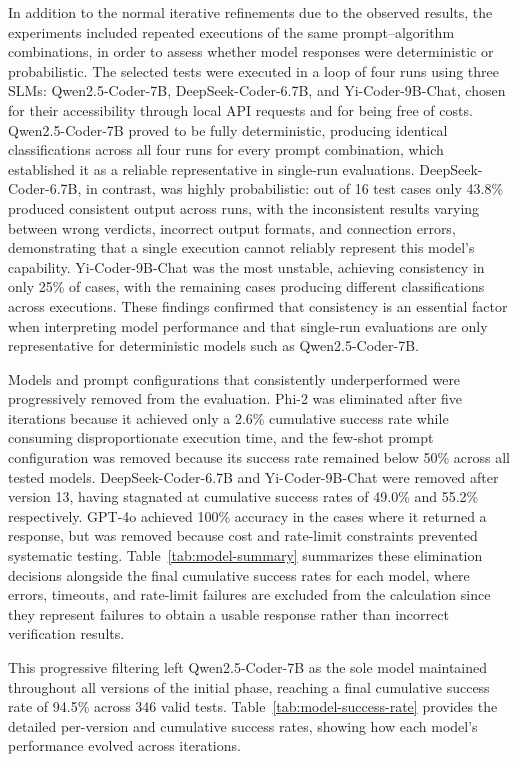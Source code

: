 In addition to the normal iterative refinements due to the observed results, the experiments included repeated executions of the same prompt--algorithm combinations, in order to assess whether model responses were deterministic or probabilistic. The selected tests were executed in a loop of four runs using three SLMs: Qwen2.5-Coder-7B, DeepSeek-Coder-6.7B, and Yi-Coder-9B-Chat, chosen for their accessibility through local API requests and for being free of costs. Qwen2.5-Coder-7B proved to be fully deterministic, producing identical classifications across all four runs for every prompt combination, which established it as a reliable representative in single-run evaluations. DeepSeek-Coder-6.7B, in contrast, was highly probabilistic: out of 16 test cases only 43.8\% produced consistent output across runs, with the inconsistent results varying between wrong verdicts, incorrect output formats, and connection errors, demonstrating that a single execution cannot reliably represent this model's capability. Yi-Coder-9B-Chat was the most unstable, achieving consistency in only 25\% of cases, with the remaining cases producing different classifications across executions. These findings confirmed that consistency is an essential factor when interpreting model performance and that single-run evaluations are only representative for deterministic models such as Qwen2.5-Coder-7B.

Models and prompt configurations that consistently underperformed were progressively removed from the evaluation. Phi-2 was eliminated after five iterations because it achieved only a 2.6\% cumulative success rate while consuming disproportionate execution time, and the few-shot prompt configuration was removed because its success rate remained below 50\% across all tested models. DeepSeek-Coder-6.7B and Yi-Coder-9B-Chat were removed after version 13, having stagnated at cumulative success rates of 49.0\% and 55.2\% respectively. GPT-4o achieved 100\% accuracy in the cases where it returned a response, but was removed because cost and rate-limit constraints prevented systematic testing. Table~\ref{tab:model-summary} summarizes these elimination decisions alongside the final cumulative success rates for each model, where errors, timeouts, and rate-limit failures are excluded from the calculation since they represent failures to obtain a usable response rather than incorrect verification results.

This progressive filtering left Qwen2.5-Coder-7B as the sole model maintained throughout all versions of the initial phase, reaching a final cumulative success rate of 94.5\% across 346 valid tests. Table~\ref{tab:model-success-rate} provides the detailed per-version and cumulative success rates, showing how each model's performance evolved across iterations.

